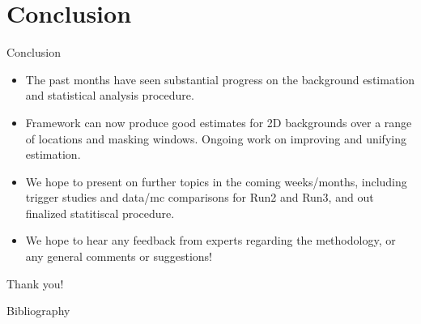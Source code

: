 \documentclass[10pt]{beamer}
\begin{document}
%   
%   


\section{Conclusion}
\label{sec:conclusion}


\begin{frame}{Conclusion}
  \begin{itemize}
  \item The past months have seen substantial progress on the background estimation and statistical analysis procedure.
  \item Framework can now produce good estimates for 2D backgrounds over a range of locations and masking windows. Ongoing work on improving and unifying estimation. 
  \item We hope to present on further topics in the coming weeks/months, including trigger studies and data/mc comparisons for Run2 and Run3, and out finalized statitiscal procedure.
  \item We hope to hear any feedback from experts regarding the methodology, or any general comments or suggestions!
  \end{itemize}
  \vspace{1cm}

  \begin{center}
    {\Large Thank you!}
  \end{center}
\end{frame}




\begin{frame}[allowframebreaks]{Bibliography}
  
  
\end{frame}


\appendix
\end{document}
